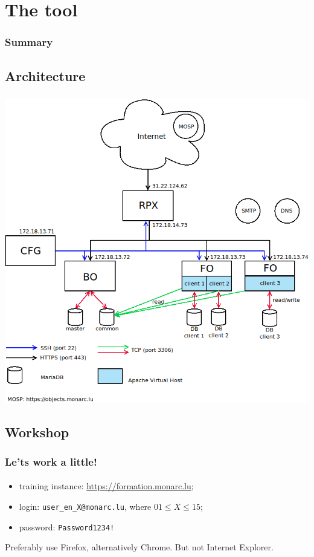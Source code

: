 %
%
\section{The tool}
\begin{frame}
    \frametitle{Summary}
\end{frame}
\subsection{Architecture}
\begin{frame}
    \frametitle{}
    \framesubtitle{}
    \begin{center}
        \includegraphics[scale=0.3]{./images/monarc-architecture.png}
    \end{center}
\end{frame}



\subsection{Workshop}
\begin{frame}
    \frametitle{Le'ts work a little!}
    \framesubtitle{}
    \begin{itemize}
        \item training instance: \url{https://formation.monarc.lu};
        \item login: \texttt{user\_en\_X@monarc.lu}, where $01 \leq X \leq 15$;
        \item password: \texttt{Password1234!}
    \end{itemize}
    \bigskip
    Preferably use Firefox, alternatively Chrome. But not Internet Explorer.
\end{frame}



